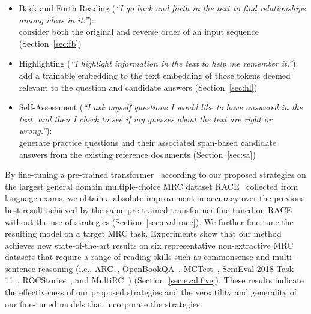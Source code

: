 \documentclass[11pt,a4paper]{article}
\newcommand{\ie}{{i.e.}}
\begin{document}
\vspace{-\topsep}
\begin{itemize}
\setlength\itemsep{-0.25em}
    \item {\sc Back and Forth Reading} (\emph{``I go back and forth in the text to find relationships among ideas in it.''}):\\
    consider both the original and reverse order of an input sequence (Section~\ref{sec:fb})
    
    \item {\sc Highlighting} (\emph{``I highlight information in the text to help me remember it.''}):\\
    add a trainable embedding to the text embedding of those tokens deemed relevant to the question and candidate answers (Section~\ref{sec:hl})
    
    \item {\sc Self-Assessment} (\emph{``I ask myself questions I would like to have answered in the text, and then I check to see if my guesses about the text are right or wrong.''}):\\
    generate practice questions and their associated span-based candidate answers from the existing reference documents (Section~\ref{sec:sa})
\end{itemize}
\vspace{-\topsep}


By fine-tuning a pre-trained transformer~\cite{radfordimproving} according to our proposed strategies on the largest general domain multiple-choice MRC dataset RACE~\cite{lai2017race} collected from language exams, we obtain a  absolute improvement in accuracy over the previous best result achieved by the same pre-trained transformer fine-tuned on RACE without the use of strategies (Section~\ref{sec:eval:race}). We further fine-tune the resulting model on a target MRC task. Experiments show that our method achieves new state-of-the-art results on six representative non-extractive MRC datasets that require a range of reading skills such as commonsense and multi-sentence reasoning (\ie, ARC~\cite{clark2016combining,clark2018think}, OpenBookQA~\cite{mihaylov2018can}, MCTest~\cite{richardson2013mctest}, SemEval-2018 Task 11~\cite{yang2017semi}, ROCStories~\cite{mostafazadeh2016corpus}, and MultiRC~\cite{khashabi2018looking}) (Section~\ref{sec:eval:five}). These results indicate the effectiveness of our proposed strategies and the versatility and generality of our fine-tuned models that incorporate the strategies.
\end{document}
